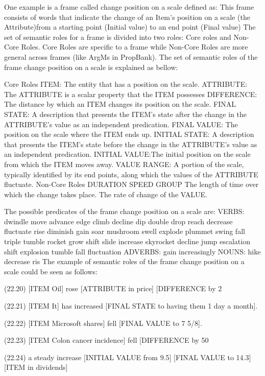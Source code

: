 One example is a frame called change position on a scale defined as:
This frame consists of words that indicate the change of an Item’s position 
on a scale (the Attribute)from a starting point (Initial value) 
to an end point (Final value)
The set of semantic roles for a frame is divided into two roles: Core roles and Non-Core Roles. Core Roles are specific to a frame while Non-Core Roles are more general across frames (like ArgMs in PropBank). The set of semantic roles of the frame change position on a scale is explained as bellow:

Core Roles
ITEM: The entity that has a position on the scale.
ATTRIBUTE: The ATTRIBUTE is a scalar property that the ITEM possesses
DIFFERENCE: The distance by which an ITEM changes its position on the scale. FINAL STATE: A description that presents the ITEM’s state after the change in the ATTRIBUTE’s value as an independent predication.
FINAL VALUE: The position on the scale where the ITEM ends up. 
INITIAL STATE: A description that presents the ITEM’s state before the change in the ATTRIBUTE’s value as an independent predication.
INITIAL VALUE:The initial position on the scale from which the ITEM moves away. 
VALUE RANGE: A portion of the scale, typically identified by its end points, along which the values of the ATTRIBUTE fluctuate. 
Non-Core Roles
DURATION SPEED GROUP
The length of time over which the change takes place.
The rate of change of the VALUE.

The possible predicates of the frame change position on a scale are:
VERBS: dwindle move advance edge climb decline dip double drop reach
decrease fluctuate rise diminish gain
soar mushroom swell
explode plummet swing fall triple tumble rocket grow shift slide increase skyrocket decline jump
escalation shift explosion tumble fall fluctuation ADVERBS: gain increasingly NOUNS: hike 
decrease ris
The example of semantic roles of the frame change position on a scale could be seen as follows:

(22.20) [ITEM Oil] rose [ATTRIBUTE in price] [DIFFERENCE by 2%

(22.21) [ITEM It] has increased [FINAL STATE to having them 1 day a month]. 

(22.22) [ITEM Microsoft shares] fell [FINAL VALUE to 7 5/8]. 

(22.23) [ITEM Colon cancer incidence] fell [DIFFERENCE by 50%

(22.24) a steady increase [INITIAL VALUE from 9.5] [FINAL VALUE to 14.3] [ITEM in dividends]

